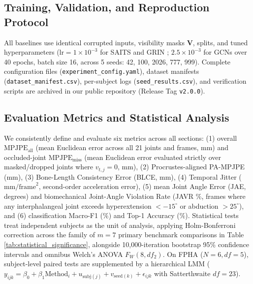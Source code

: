 \documentclass[10pt,twocolumn]{article}
\begin{document}
\subsection{Training, Validation, and Reproduction Protocol}
All baselines use identical corrupted inputs, visibility masks $\mathbf{V}$, splits, and tuned hyperparameters ($\text{lr}=1\times 10^{-3}$ for SAITS \cite{du2023saits} and GRIN \cite{cini2022filling}; $2.5\times 10^{-3}$ for GCNs over 40 epochs, batch size 16, across 5 seeds: 42, 100, 2026, 777, 999). Complete configuration files (\texttt{experiment\_config.yaml}), dataset manifests (\texttt{dataset\_manifest.csv}), per-subject logs (\texttt{seed\_results.csv}), and verification scripts are archived in our public repository (Release Tag \texttt{v2.0.0}).

\subsection{Evaluation Metrics and Statistical Analysis}
We consistently define and evaluate six metrics across all sections: (1) overall $\text{MPJPE}_{\text{all}}$ (mean Euclidean error across all 21 joints and frames, mm) and occluded-joint $\text{MPJPE}_{\text{miss}}$ (mean Euclidean error evaluated strictly over masked/dropped joints where $v_{t,j}=0$, mm), (2) Procrustes-aligned PA-MPJPE (mm), (3) Bone-Length Consistency Error (BLCE, mm), (4) Temporal Jitter ($\text{mm/frame}^2$, second-order acceleration error), (5) mean Joint Angle Error (JAE, degrees) and biomechanical Joint-Angle Violation Rate (JAVR $\%$, frames where any interphalangeal joint exceeds hyperextension $<-15^\circ$ or abduction $>25^\circ$), and (6) classification Macro-F1 ($\%$) and Top-1 Accuracy ($\%$). Statistical tests treat independent subjects as the unit of analysis, applying Holm-Bonferroni correction across the family of $m=7$ primary benchmark comparisons in Table \ref{tab:statistical_significance}, alongside 10,000-iteration bootstrap 95\% confidence intervals and omnibus Welch's ANOVA $F_W(8, df_2)$. On FPHA ($N=6, df=5$), subject-level paired tests are supplemented by a hierarchical LMM ($y_{ijk} = \beta_0 + \beta_1\text{Method}_i + u_{\text{subj}(j)} + v_{\text{seed}(k)} + \epsilon_{ijk}$ with Satterthwaite $df=23$).
\end{document}
